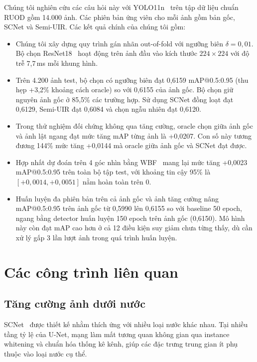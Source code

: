 \documentclass[runningheads]{llncs}
\begin{document}
Chúng tôi nghiên cứu các câu hỏi này với YOLO11n~\cite{jocherUltralyticsYOLO2024} trên tập dữ liệu chuẩn RUOD gồm 14.000 ảnh. Các phiên bản ứng viên cho mỗi ảnh gồm bản gốc, SCNet và Semi-UIR. Các kết quả chính của chúng tôi gồm:
\begin{itemize}
    \item Chúng tôi xây dựng quy trình gán nhãn out-of-fold với ngưỡng biên $\delta = 0{,}01$. Bộ chọn ResNet18~\cite{heDeepResidualLearning2016} hoạt động trên ảnh đầu vào kích thước $224 \times 224$ với độ trễ 7,7\,ms mỗi khung hình.
    \item Trên 4.200 ảnh test, bộ chọn có ngưỡng biên đạt 0,6159 mAP@0.5:0.95 (thu hẹp +3,2\% khoảng cách oracle) so với 0,6155 của ảnh gốc. Bộ chọn giữ nguyên ảnh gốc ở 85,5\% các trường hợp. Sử dụng SCNet đồng loạt đạt 0,6129, Semi-UIR đạt 0,6084 và chọn ngẫu nhiên đạt 0,6120.
    \item Trong thử nghiệm đối chứng không qua tăng cường, oracle chọn giữa ảnh gốc và ảnh lật ngang đạt mức tăng mAP từng ảnh là +0,0207. Con số này tương đương 144\% mức tăng +0,0144 mà oracle giữa ảnh gốc và SCNet đạt được.
    \item Hợp nhất dự đoán trên 4 góc nhìn bằng WBF~\cite{solovyevWeightedBoxesFusion2021} mang lại mức tăng +0,0023 mAP@0.5:0.95 trên toàn bộ tập test, với khoảng tin cậy 95\% là $[+0{,}0014, +0{,}0051]$ nằm hoàn toàn trên 0.
    \item Huấn luyện đa phiên bản trên cả ảnh gốc và ảnh tăng cường nâng mAP@0.5:0.95 trên ảnh gốc từ 0,5990 lên 0,6155 so với baseline 50 epoch, ngang bằng detector huấn luyện 150 epoch trên ảnh gốc (0,6150). Mô hình này còn đạt mAP cao hơn ở cả 12 điều kiện suy giảm chưa từng thấy, dù cần xử lý gấp 3 lần lượt ảnh trong quá trình huấn luyện.
\end{itemize}

\section{Các công trình liên quan}
\label{sec:related}

\subsection{Tăng cường ảnh dưới nước}

SCNet~\cite{fuUnderwaterImageEnhancement2022} được thiết kế nhằm thích ứng với nhiều loại nước khác nhau. Tại nhiều tầng tỷ lệ của U-Net, mạng làm mất tương quan không gian qua instance whitening và chuẩn hóa thống kê kênh, giúp các đặc trưng trung gian ít phụ thuộc vào loại nước cụ thể.
\end{document}
